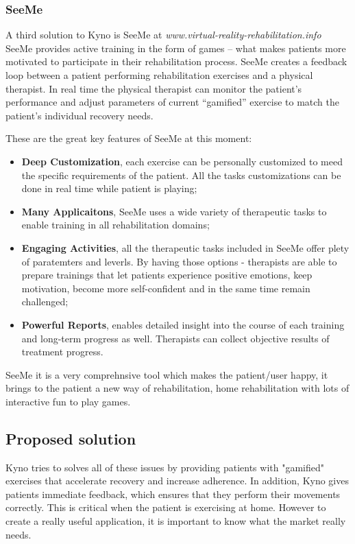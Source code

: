 \subsubsection{SeeMe}
A third solution to Kyno is  SeeMe at \textit{www.virtual-reality-rehabilitation.info}
SeeMe provides active training in the form of games – what
makes patients more motivated to participate in their
rehabilitation process. SeeMe creates a feedback loop
between a patient performing rehabilitation exercises and
a physical therapist. In real time the physical therapist can
monitor the patient’s performance and adjust
parameters of current “gamified” exercise to match the
patient’s individual recovery needs.

These are the great key features of SeeMe at this moment:
\begin{itemize}
\item \textbf{ Deep Customization}, each exercise can be personally customized to meed the specific requirements of the patient. All the tasks customizations can be done in real time while patient is playing;

\item \textbf{Many Applicaitons}, SeeMe uses a wide variety of therapeutic tasks to enable training in all rehabilitation domains;

\item \textbf{Engaging Activities}, all the therapeutic tasks included in SeeMe offer plety of paratemters and leverls. By having those options - therapists are able to prepare trainings that let patients experience positive emotions, keep motivation, become more self-confident and in the same time remain challenged;

\item \textbf{Powerful Reports}, enables detailed insight into the course of each training and long-term progress as well. Therapists can collect objective results of treatment progress.


\end{itemize}

SeeMe it is a very comprehnsive tool which makes the patient/user happy, it brings to the patient a new way of rehabilitation, home rehabilitation with lots of interactive fun to play games.


\subsection {Proposed solution}

Kyno tries to solves all of these issues by providing patients with "gamified" exercises that accelerate recovery and increase adherence. In addition, Kyno gives patients immediate feedback, which ensures that they perform their movements correctly. This is critical when the patient is exercising at home. However to create a really useful application, it is important to know what the market really needs.

